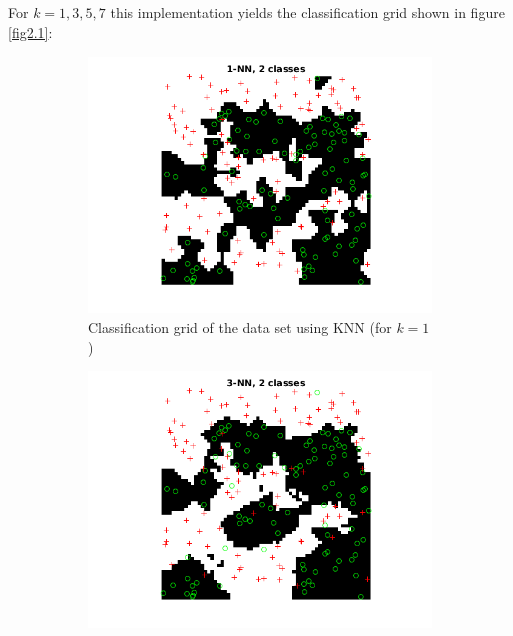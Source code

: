 \documentclass[10pt]{article}
\begin{document}
\subsection{}
For $k={1, 3, 5, 7}$ this implementation yields the classification grid shown in figure \ref{fig2.1}:
\begin{figure}[H]
  \centering
  \begin{subfigure}{.48\textwidth}
    \includegraphics[width=1\linewidth]{assign2_2_1.png}
    \caption{Classification grid of the data set using KNN (for $k=1$)}
    \label{fig2.1a}
  \end{subfigure}
  \begin{subfigure}{.48\textwidth}
    \includegraphics[width=1\linewidth]{assign2_2_3.png}

\end{subfigure}
\end{figure}
\end{document}
